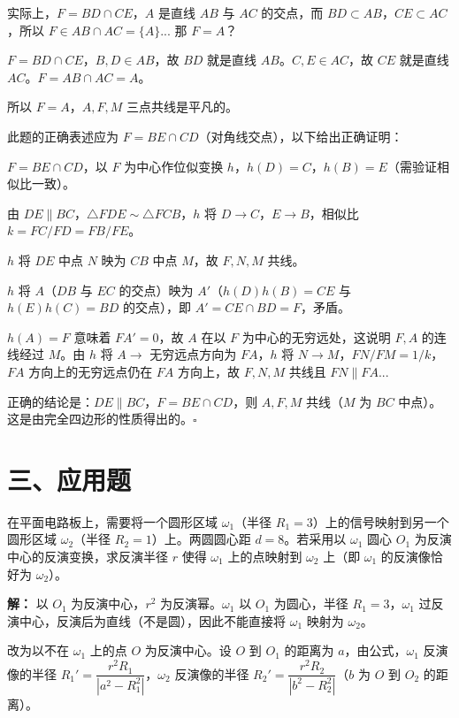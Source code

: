 \documentclass[12pt, a4paper]{ctexart}
\begin{document}
实际上，$F = BD \cap CE$，$A$ 是直线 $AB$ 与 $AC$ 的交点，而 $BD \subset AB$，$CE \subset AC$，所以 $F \in AB \cap AC = \{A\}$... 那 $F = A$？

$F = BD \cap CE$，$B, D \in AB$，故 $BD$ 就是直线 $AB$。$C, E \in AC$，故 $CE$ 就是直线 $AC$。$F = AB \cap AC = A$。

所以 $F = A$，$A, F, M$ 三点共线是平凡的。

此题的正确表述应为 $F = BE \cap CD$（对角线交点），以下给出正确证明：

$F = BE \cap CD$，以 $F$ 为中心作位似变换 $h$，$h(D) = C$，$h(B) = E$（需验证相似比一致）。

由 $DE \parallel BC$，$\triangle FDE \sim \triangle FCB$，$h$ 将 $D \to C$，$E \to B$，相似比 $k = FC/FD = FB/FE$。

$h$ 将 $DE$ 中点 $N$ 映为 $CB$ 中点 $M$，故 $F, N, M$ 共线。

$h$ 将 $A$（$DB$ 与 $EC$ 的交点）映为 $A'$（$h(D)h(B) = CE$ 与 $h(E)h(C) = BD$ 的交点），即 $A' = CE \cap BD = F$，矛盾。

$h(A) = F$ 意味着 $FA' = 0$，故 $A$ 在以 $F$ 为中心的无穷远处，这说明 $F, A$ 的连线经过 $M$。由 $h$ 将 $A \to$ 无穷远点方向为 $FA$，$h$ 将 $N \to M$，$FN/FM = 1/k$，$FA$ 方向上的无穷远点仍在 $FA$ 方向上，故 $F, N, M$ 共线且 $FN \parallel FA$...

正确的结论是：$DE \parallel BC$，$F = BE \cap CD$，则 $A, F, M$ 共线（$M$ 为 $BC$ 中点）。这是由完全四边形的性质得出的。$\square$

\section*{\textcolor{apppurple}{三、应用题}}

\begin{appbox}[【应用1】反演变换在电路中的应用]
在平面电路板上，需要将一个圆形区域 $\omega_1$（半径 $R_1 = 3$）上的信号映射到另一个圆形区域 $\omega_2$（半径 $R_2 = 1$）上。两圆圆心距 $d = 8$。若采用以 $\omega_1$ 圆心 $O_1$ 为反演中心的反演变换，求反演半径 $r$ 使得 $\omega_1$ 上的点映射到 $\omega_2$ 上（即 $\omega_1$ 的反演像恰好为 $\omega_2$）。
\end{appbox}

\textbf{解：} 以 $O_1$ 为反演中心，$r^2$ 为反演幂。$\omega_1$ 以 $O_1$ 为圆心，半径 $R_1 = 3$，$\omega_1$ 过反演中心，反演后为直线（不是圆），因此不能直接将 $\omega_1$ 映射为 $\omega_2$。

改为以不在 $\omega_1$ 上的点 $O$ 为反演中心。设 $O$ 到 $O_1$ 的距离为 $a$，由公式，$\omega_1$ 反演像的半径 $R_1' = \dfrac{r^2 R_1}{|a^2 - R_1^2|}$，$\omega_2$ 反演像的半径 $R_2' = \dfrac{r^2 R_2}{|b^2 - R_2^2|}$（$b$ 为 $O$ 到 $O_2$ 的距离）。
\end{document}
